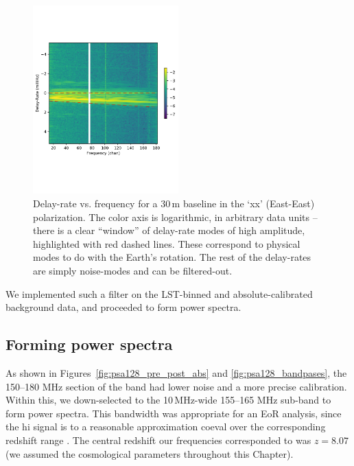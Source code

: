 \begin{figure}
\centering
\includegraphics[width=0.5\textwidth]{chapters/psa128_pol/figures/fringerate_example.pdf}
\caption[Delay-rate vs. frequency for a 30\,m baseline in the `xx' (East-East) polarization.]{Delay-rate vs. frequency for a 30\,m baseline in the `xx' (East-East) polarization. The color axis is logarithmic, in arbitrary data units -- there is a clear ``window'' of delay-rate modes of high amplitude, highlighted with red dashed lines. These correspond to physical modes to do with the Earth's rotation. The rest of the delay-rates are simply noise-modes and can be filtered-out.}
\label{fig:fringerate_example}
\end{figure}

We implemented such a filter on the LST-binned and absolute-calibrated background data, and proceeded to form power spectra.

\subsection{Forming power spectra}

As shown in Figures~\ref{fig:psa128_pre_post_abs} and \ref{fig:psa128_bandpases}, the 150--180 MHz section of the band had lower noise and a more precise calibration. Within this, we down-selected to the 10\,MHz-wide 155--165 MHz sub-band to form power spectra. This bandwidth was appropriate for an EoR analysis, since the {\sc hi} signal is to a reasonable approximation coeval over the corresponding redshift range \citep{Furlanetto.06}. The central redshift our frequencies corresponded to was $z=8.07$ (we assumed the \cite{Planck.16} cosmological parameters throughout this Chapter).

